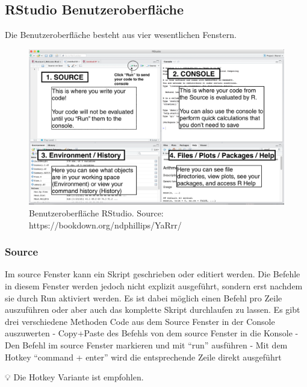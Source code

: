 \documentclass[
]{article}
\begin{document}
\hypertarget{rstudio-benutzeroberfluxe4che}{%
\subsection{RStudio Benutzeroberfläche}\label{rstudio-benutzeroberfluxe4che}}

Die Benutzeroberfläche besteht aus vier wesentlichen Fenstern.

\begin{figure}

{\centering \includegraphics[width=1\linewidth]{images/007} 

}

\caption{Benutzeroberfläche RStudio. Source: https://bookdown.org/ndphillips/YaRrr/}\label{fig:unnamed-chunk-13}
\end{figure}

\hypertarget{source}{%
\subsubsection{Source}\label{source}}

Im source Fenster kann ein Skript geschrieben oder editiert werden. Die Befehle in diesem Fenster werden jedoch nicht explizit ausgeführt, sondern erst nachdem sie durch Run aktiviert werden. Es ist dabei möglich einen Befehl pro Zeile auszuführen oder aber auch das komplette Skript durchlaufen zu lassen.
Es gibt drei verschiedene Methoden Code aus dem Source Fenster in der Console auszuwerten
- Copy+Paste des Befehls von dem source Fenster in die Konsole
- Den Befehl im source Fenster markieren und mit ``run'' ausführen
- Mit dem Hotkey ``command + enter'' wird die entsprechende Zeile direkt ausgeführt

💡 Die Hotkey Variante ist empfohlen.
\end{document}
